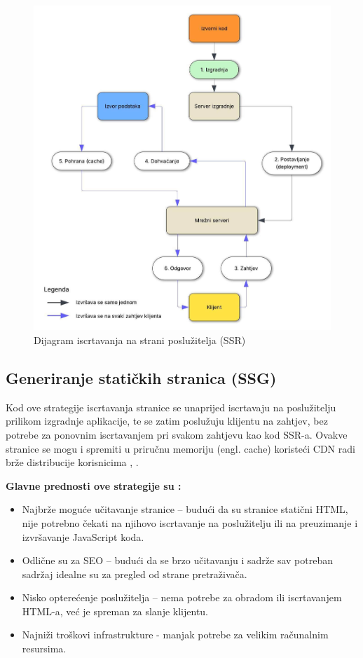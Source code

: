 \begin{figure}[H]
    \centering
    \includegraphics[width=\textwidth]{slike/uvod/SSR.jpg}
    \caption{Dijagram iscrtavanja na strani poslužitelja (SSR)}
    \label{fig:ssr-diagram}
\end{figure}

\subsection{Generiranje statičkih stranica (SSG)}

Kod ove strategije iscrtavanja stranice se unaprijed iscrtavaju na poslužitelju prilikom izgradnje aplikacije, te se zatim poslužuju klijentu na zahtjev, bez potrebe za ponovnim iscrtavanjem pri svakom zahtjevu kao kod SSR-a. Ovakve stranice se mogu i spremiti u priručnu memoriju (engl. cache) koristeći CDN radi brže distribucije korisnicima \cite{nextjsssg}, \cite{sanityssg}.

\bigskip
\textbf{Glavne prednosti ove strategije su \cite{moore2024rendering}: }
\begin{itemize}
    \item Najbrže moguće učitavanje stranice – budući da su stranice statični HTML, nije potrebno čekati na njihovo iscrtavanje na poslužitelju ili na preuzimanje i izvršavanje JavaScript koda.
    \item Odlične su za SEO – budući da se brzo učitavanju i sadrže sav potreban sadržaj idealne su za pregled od strane pretraživača.
    \item Nisko opterećenje poslužitelja – nema potrebe za obradom ili iscrtavanjem HTML-a, već je spreman za slanje klijentu.
    \item Najniži troškovi infrastrukture - manjak potrebe za velikim računalnim resursima.
\end{itemize}

